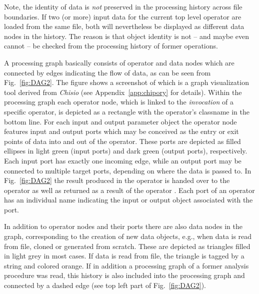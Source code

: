 Note, the identity of data is {\em not} preserved in the processing history
across file boundaries. If two (or more) input data for the current top
level operator are loaded
from the same file, both will nevertheless be displayed as different data
nodes in the history. The reason is that object identity is not -- and maybe even cannot -- be checked from the
processing history of former operations.

A processing graph basically consists of operator and data nodes which are connected by edges 
indicating the flow of data, as can be seen from Fig.~\ref{fig:DAG2}. 
The figure shows a screenshot of \mtbc which is a graph visualization tool derived from {\em Chisio}
(see Appendix~\ref{app:chipory} for details).
Within the processing graph each operator node, which is linked to the {\em invocation} of a specific operator,
is depicted as a rectangle with the operator's 
classname in the bottom line.
For each input and output parameter object the operator node features input and output ports which may be conceived as the entry or exit points of data into and out of the operator. These ports are depicted as filled ellipses in light green (input ports) and dark green (output ports),
respectively. Each input port has exactly one incoming edge, while an output
port may be connected to multiple target ports,
depending on where the data is passed to. In Fig.~\ref{fig:DAG2} the result
 produced in the operator 
is handed over to the operator  as well as
returned as a result of the operator
. Each port of an operator has an individual name indicating the input or output object associated
with the port. 

In addition to operator nodes and their ports there are also data nodes in the
graph, corresponding to the creation of new data objects, e.g., when data is read from
file, cloned or generated from scratch. These are depicted as triangles filled
in light grey in most cases.
If data is read from file, the triangle is tagged by a string
and colored orange.
If in addition
a processing graph of a
former analysis procedure was read, this history is also included into the
processing graph
and connected by a dashed edge (see top left part of Fig.~\ref{fig:DAG2}).


